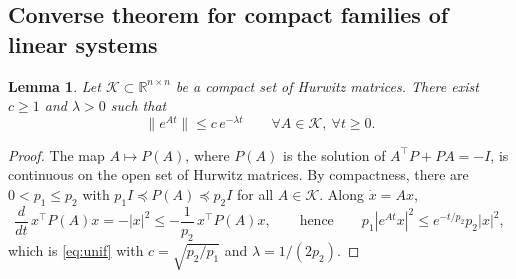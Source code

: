 \documentclass[preprint,12pt,authoryear]{elsarticle}
\newtheorem{lemma}[theorem]{Lemma}
\theoremstyle{definition}
\theoremstyle{remark}
\newcommand{\R}{\mathbb{R}}
\newcommand{\tr}{^{\top}}
\newcommand{\KK}{\mathcal{K}}
\begin{document}
\subsection{Converse theorem for compact families of linear systems}
\begin{lemma}\label{lem:unif}
Let $\KK\subset\R^{n\times n}$ be a compact set of Hurwitz matrices. There exist $c\ge1$ and $\lambda>0$ such that
\begin{equation}\label{eq:unif}
\|e^{At}\|\le c\,e^{-\lambda t}\qquad\forall A\in\KK,\ \forall t\ge0 .
\end{equation}
\end{lemma}
\begin{proof}
The map $A\mapsto P(A)$, where $P(A)$ is the solution of $A\tr P+PA=-I$, is continuous on the open set of Hurwitz matrices. By compactness, there are $0<p_1\le p_2$ with $p_1I\preceq P(A)\preceq p_2I$ for all $A\in\KK$. Along $\dot x=Ax$,
\begin{equation}
\frac{d}{dt}\,x\tr P(A)x=-|x|^2\le-\frac1{p_2}\,x\tr P(A)x,\qquad\text{hence}\qquad p_1|e^{At}x|^2\le e^{-t/p_2}p_2|x|^2 ,
\end{equation}
which is \eqref{eq:unif} with $c=\sqrt{p_2/p_1}$ and $\lambda=1/(2p_2)$.
\end{proof}
\end{document}
